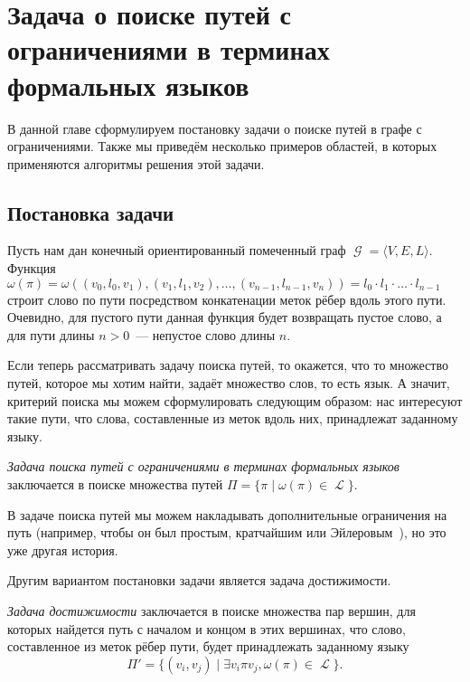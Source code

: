 \setchapterpreamble[u]{\margintoc}
\chapter[Пути с ограничениями в терминах формальных языков]{Задача о поиске путей с ограничениями в терминах формальных языков}
\label{chpt:FLPQ}

В данной главе сформулируем постановку задачи о поиске путей в графе с ограничениями.
Также мы приведём несколько примеров областей, в которых применяются алгоритмы решения этой задачи.

\section{Постановка задачи}

Пусть нам дан конечный ориентированный помеченный граф $\mscrG = \langle V, E, L \rangle$.
Функция $\omega(\pi) = \omega((v_0, l_0, v_1), (v_1, l_1, v_2), \dots, (v_{n-1}, l_{n-1}, v_n)) = l_0 \cdot l_1 \cdot \dots \cdot l_{n-1}$ строит слово по пути посредством конкатенации меток рёбер вдоль этого пути.
Очевидно, для пустого пути данная функция будет возвращать пустое слово, а для пути длины $n  > 0$~--- непустое слово длины $n$.

Если теперь рассматривать задачу поиска путей, то окажется, что то множество путей, которое мы хотим найти, задаёт множество слов, то есть язык.
А значит, критерий поиска мы можем сформулировать следующим образом: нас интересуют такие пути, что слова, составленные из меток вдоль них, принадлежат заданному языку.

\begin{definition}
    \label{def1}
    \emph{Задача поиска путей с ограничениями в терминах формальных языков} заключается в поиске множества путей $\Pi = \{\pi \mid \omega(\pi) \in \mscrL\}$.
\end{definition}

В задаче поиска путей мы можем накладывать дополнительные ограничения на путь (например, чтобы он был простым, кратчайшим или Эйлеровым~), но это уже другая история.

Другим вариантом постановки задачи является задача достижимости.

\begin{definition}
    \label{def2}
    \emph{Задача достижимости} заключается в поиске множества пар вершин, для которых найдется путь с началом и концом в этих вершинах, что слово, составленное из меток рёбер пути, будет принадлежать заданному языку
    \[\Pi' = \{(v_{i}, v_{j}) \mid \exists v_{i} \pi v_{j}, \omega(\pi) \in \mscrL\}.\]
\end{definition}

